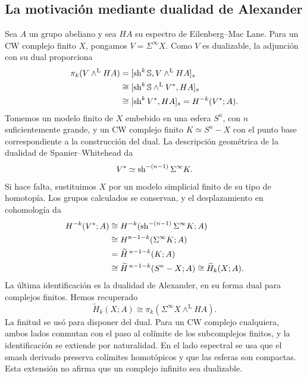\subsection{La motivación mediante dualidad de Alexander}
Sea $A$ un grupo abeliano y sea $HA$ su espectro de Eilenberg--Mac Lane. Para un CW complejo finito $X$, pongamos $V=\Sigma^\infty X$. Como $V$ es dualizable, la adjunción con su dual proporciona
\[
\begin{aligned}
\pi_k(V\wedge^{\mathrm L}HA)
&=[\operatorname{sh}^k\mathbb S,V\wedge^{\mathrm L}HA]_s\\
&\cong[\operatorname{sh}^k\mathbb S\wedge^{\mathrm L}V^*,HA]_s\\
&\cong[\operatorname{sh}^kV^*,HA]_s=H^{-k}(V^*;A).
\end{aligned}
\]
Tomemos un modelo finito de $X$ embebido en una esfera $S^n$, con $n$ suficientemente grande, y un CW complejo finito $K\simeq S^n-X$ con el punto base correspondiente a la construcción del dual. La descripción geométrica de la dualidad de Spanier--Whitehead da
\[
V^*\simeq\operatorname{sh}^{-(n-1)}\Sigma^\infty K.
\]
Si hace falta, sustituimos $X$ por un modelo simplicial finito de su tipo de homotopía. Los grupos calculados se conservan, y el desplazamiento en cohomología da
\[
\begin{aligned}
H^{-k}(V^*;A)
&\cong H^{-k}(\operatorname{sh}^{-(n-1)}\Sigma^\infty K;A)\\
&\cong H^{n-1-k}(\Sigma^\infty K;A)\\
&=\widetilde H^{\,n-1-k}(K;A)\\
&\cong\widetilde H^{\,n-1-k}(S^n-X;A)
\cong\widetilde H_k(X;A).
\end{aligned}
\]
La última identificación es la dualidad de Alexander, en su forma dual para complejos finitos. Hemos recuperado
\begin{equation}\label{eq:c19-homologia-ordinaria}
\widetilde H_k(X;A)\cong
\pi_k(\Sigma^\infty X\wedge^{\mathrm L}HA).
\end{equation}
La finitud se usó para disponer del dual. Para un CW complejo cualquiera, ambos lados conmutan con el paso al colímite de los subcomplejos finitos, y la identificación se extiende por naturalidad. En el lado espectral se usa que el smash derivado preserva colímites homotópicos y que las esferas son compactas. Esta extensión no afirma que un complejo infinito sea dualizable.

